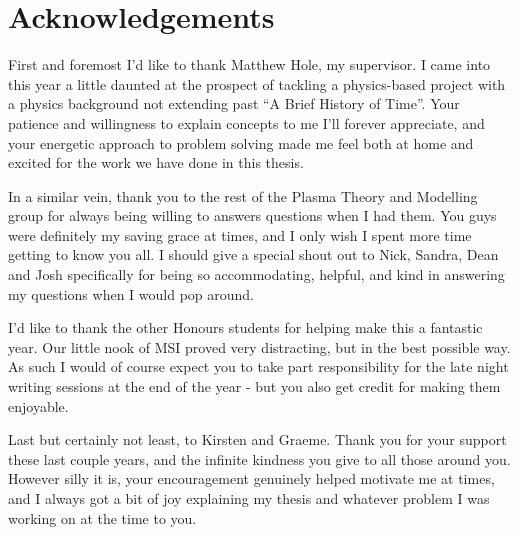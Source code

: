 
\chapter*{Acknowledgements}\label{acknowledgements}


First and foremost I'd like to thank Matthew Hole, my supervisor. I came 
into this year a little daunted at the prospect of tackling a physics-based 
project with a physics background not extending past ``A Brief History of Time''.
Your patience and willingness to explain concepts to me I'll forever appreciate, 
and your energetic approach to problem solving made me feel both at home and excited 
for the work we have done in this thesis. 

In a similar vein, thank you to the rest of the Plasma Theory and Modelling group for always being 
willing to answers questions when I had them. You guys were definitely my saving grace 
at times, and I only wish I spent more time getting to know you all. I should give 
a special shout out to Nick, Sandra, Dean and Josh specifically for being so 
accommodating, helpful, and kind in answering my questions when I would pop around.

I'd like to thank the other Honours students for helping make this a fantastic 
year. Our little nook of MSI proved very distracting, but in the best possible 
way. As such I would of course expect you to take part responsibility for the late night 
writing sessions at the end of the year - but you also get 
credit for making them enjoyable.

Last but certainly not least, to Kirsten and Graeme. Thank you for your support these last 
couple years, and the infinite kindness you give to all those around you. However silly it is, 
your encouragement genuinely helped motivate me at times, and I always got a bit of joy 
explaining my thesis and whatever problem I was working on at the time to you.